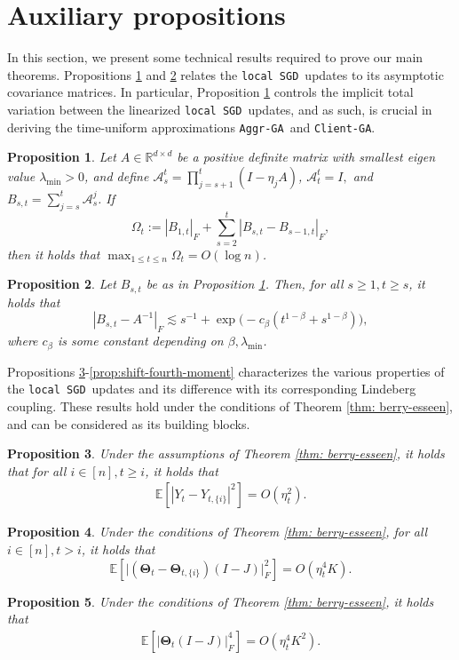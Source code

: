 \documentclass[a4paper,11pt]{article}
\numberwithin{equation}{section}
\theoremstyle{plain}
\newtheorem{proposition}{Proposition}
\theoremstyle{remark}
\def\IE{\mathbb{E}}
\def\R{\mathbb{R}}
\def\bT{\mathbf{\Theta}}
\newcommand{\shift}[2]{#1_{#2, \{i\}}}
\newcommand{\DFL}{\texttt{local SGD}}
\newcommand{\ag}{\texttt{Aggr-GA}}
\newcommand{\cg}{\texttt{Client-GA}}
\begin{document}
\section{Auxiliary propositions}\label{se:proof-2}
In this section, we present some technical results required to prove our main theorems. Propositions \ref{prop:succ-def} and \ref{prop:inv-conv} relates the \DFL\ updates to its asymptotic covariance matrices. In particular, Proposition \ref{prop:succ-def} controls the implicit total variation between the linearized \DFL\ updates, and as such, is crucial in deriving the time-uniform approximations \ag\ and \cg. 
\begin{proposition} \label{prop:succ-def}
    Let $A\in \R^{d \times d}$ be a positive definite matrix with smallest eigen value $\lambda_{\min}>0$, and define $\mathcal{A}_s^t=\prod_{j=s+1}^t (I-\eta_j A)$, $\mathcal{A}_t^t=I,$ and $B_{s,t}= \sum_{j=s}^t\mathcal{A}_s^j$. If \[ \Omega_t := |B_{1,t}|_F + \sum_{s=2}^t|B_{s,t} - B_{s-1, t}|_F,\]
    then it holds that $\max_{1\leq t\leq n} \Omega_t = O(\log n)$.
\end{proposition}
\begin{proposition}\label{prop:inv-conv}
    Let $B_{s,t}$ be as in Proposition \ref{prop:succ-def}. Then, for all $s \geq 1, t\geq s$, it holds that 
    \[ |B_{s,t} - A^{-1}|_F \lesssim s^{-1} + \exp\big(-c_{\beta}(t^{1-\beta} + s^{1-\beta})\big),  \]
    where $c_{\beta}$ is some constant depending on $\beta, \lambda_{\min}$.
\end{proposition}

Propositions \ref{lemma:shift-second-moment}-\ref{prop:shift-fourth-moment} characterizes the various properties of the \DFL\ updates and its difference with its corresponding Lindeberg coupling. These results hold under the conditions of Theorem \ref{thm: berry-esseen}, and can be considered as its building blocks. 

\begin{proposition} \label{lemma:shift-second-moment}
    Under the assumptions of Theorem \ref{thm: berry-esseen}, it holds that for all $i\in [n], t\geq i$, it holds that
    \begin{align} \label{eq:shift-second-moment}
        \IE[|Y_t - \shift{Y}{t}|^2] = O(\eta_t^2).
    \end{align}
\end{proposition}
\begin{proposition} \label{prop:theta-Y-diff-shift}
    Under the conditions of Theorem \ref{thm: berry-esseen}, for all $i\in[n], t > i$, it holds that 
    \[ \IE[\big| (\bT_t -\shift{\bT}{t})(I-J)\big|_F^2] = O(\eta_t^4 K).\]
\end{proposition}
\begin{proposition}\label{prop:fourth-moment-difference}
  Under the conditions of Theorem \ref{thm: berry-esseen}, it holds that 
    \begin{align} \label{eq:fourth-moment-difference}
        \IE[|\bT_t(I-J)|_F^4]=O(\eta_t^4K^2).
    \end{align}
\end{proposition}
\end{document}

